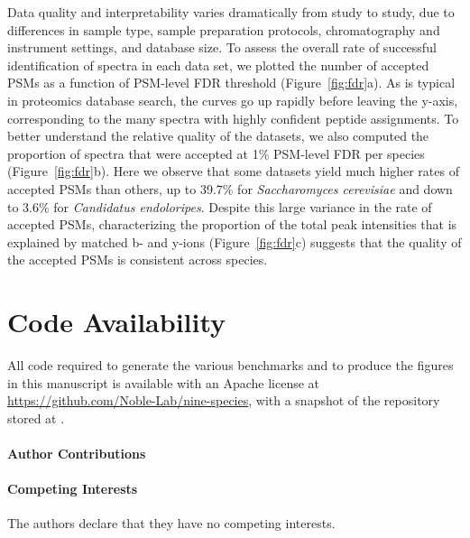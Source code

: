 \documentclass{article}
\newcommand{\fixme}[1]{{\color{red}{\bf #1}\color{black}}}
\begin{document}
Data quality and interpretability varies dramatically from study to study, due to differences in sample type, sample preparation protocols, chromatography and instrument settings, and database size.
To assess the overall rate of successful identification of spectra in each data set, we plotted the number of accepted PSMs as a function of PSM-level FDR threshold (Figure~\ref{fig:fdr}a).
As is typical in proteomics database search, the curves go up rapidly before leaving the y-axis, corresponding to the many spectra with highly confident peptide assignments.
To better understand the relative quality of the datasets, we also computed the proportion of spectra that were accepted at 1\% PSM-level FDR per species (Figure~\ref{fig:fdr}b).
Here we observe that some datasets yield much higher rates of accepted PSMs than others, up to 39.7\% for \textit{Saccharomyces cerevisiae} and down to 3.6\% for \textit{Candidatus endoloripes}.
Despite this large variance in the rate of accepted PSMs, characterizing the proportion of the total peak intensities that is explained by matched b- and y-ions (Figure~\ref{fig:fdr}c) suggests that the quality of the accepted PSMs is consistent across species.

\section*{Code Availability}
All code required to generate the various benchmarks and to produce the figures in this manuscript is available with an Apache license at \url{https://github.com/Noble-Lab/nine-species}, with a snapshot of the repository stored at \fixme{zenodo}.



\paragraph{Author Contributions}

\paragraph{Competing Interests}
The authors declare that they have no competing interests.
  
\end{document}
